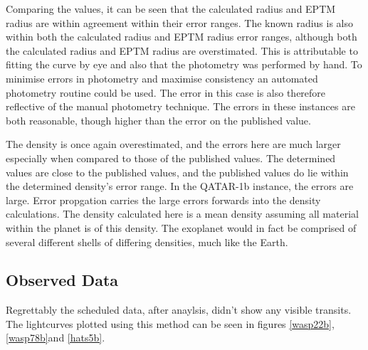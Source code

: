 \documentclass{report}
\begin{document}
Comparing the values, it can be seen that the calculated radius and EPTM radius are within agreement within their error ranges. The known radius is also within both the calculated radius and EPTM radius error ranges, although both the calculated radius and EPTM radius are overstimated. This is attributable to fitting the curve by eye and also that the photometry was performed by hand. To minimise errors in photometry and maximise consistency an automated photometry routine could be used. The error in this case is also therefore reflective of the manual photometry technique. The errors in these instances are both reasonable, though higher than the error on the published value. 

The density is once again overestimated, and the errors here are much larger especially when compared to those of the published values. The determined values are close to the published values, and the published values do lie within the determined density's error range. In the QATAR-1b instance, the errors are large. Error propgation carries the large errors forwards into the density calculations. The density calculated here is a mean density assuming all material within the planet is of this density. The exoplanet would in fact be comprised of several different shells of differing densities, much like the Earth. 

\subsection{Observed Data}
Regrettably the scheduled data, after anaylsis, didn't show any visible transits. The lightcurves plotted using this method can be seen in figures \ref{wasp22b}, \ref{wasp78b}and \ref{hats5b}.
\end{document}
